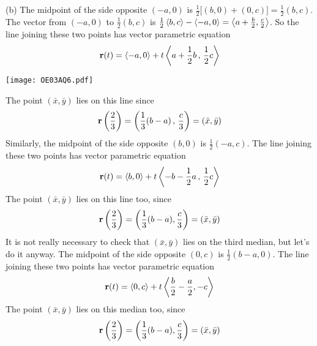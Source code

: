 \begin{solution}
(b) The midpoint of the side opposite $(-a,0)$ is $\frac{1}{2}\big[(b,0)+(0,c)\big]=\frac{1}{2}(b,c)$.
The vector from $(-a,0)$ to $\frac{1}{2}(b,c)$ is $ \frac{1}{2}\left< b,c\right>-\left<-a,0\right>
=\left< a+\frac{b}{2},\frac{c}{2}\right>$. So
the line joining these two points has vector parametric equation
\begin{equation*}
\mathbf{r}(t)=\left< -a,0\right>+t\left< a+\frac{1}{2} b\,,\,\frac{1}{2} c\right>
\end{equation*}
\begin{center}
     \texttt{[image: OE03AQ6.pdf]}
\end{center}
The point $(\bar x,\bar y)$ lies on this line since
\begin{equation*}
\mathbf{r}\left(\frac{2}{3}\right)=\left(\frac{1}{3}(b-a)\,,\,\frac{c}{3}\right)
=(\bar x,\bar y)
\end{equation*}
Similarly, the midpoint of the side opposite $(b,0)$ is $\frac{1}{2}(-a,c)$.
The line joining these two points has vector parametric equation
\begin{equation*}
\mathbf{r}(t)=\left< b,0\right> +t\left<-b-\frac{1}{2} a\,,\,\frac{1}{2} c\right>
\end{equation*}
The point $(\bar x,\bar y)$ lies on this line too, since
\begin{equation*}
\mathbf{r}\left(\frac{2}{3}\right)=\left(\frac{1}{3}(b-a),\frac{c}{3}\right)
=(\bar x,\bar y)
\end{equation*}
It is not really necessary to check that $(\bar x,\bar y)$ lies on the
third median, but let's do it anyway. The midpoint of the side opposite $(0,c)$ is $\frac{1}{2}(b-a,0)$.
The line joining these two points has vector parametric equation
\begin{equation*}
\mathbf{r}(t)=\left< 0,c\right>+t\left<\frac{b}{2}-\frac{a}{2},-c\right>
\end{equation*}
The point $(\bar x,\bar y)$ lies on this median too, since
\begin{equation*}
\mathbf{r}\left(\frac{2}{3}\right)=\left(\frac{1}{3}(b-a),\frac{c}{3}\right)
=(\bar x,\bar y)
\end{equation*}
\end{solution}